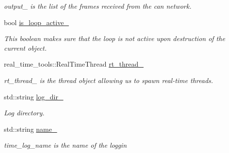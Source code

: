 \begin{DoxyCompactItemize}
\begin{DoxyCompactList}\small\item\em output\+\_\+ is the list of the frames received from the can network. \end{DoxyCompactList}\item 
bool \hyperlink{classblmc__drivers_1_1CanBus_a85c9d5d9c6413c6871d48a247660ac20}{is\+\_\+loop\+\_\+active\+\_\+}\hypertarget{classblmc__drivers_1_1CanBus_a85c9d5d9c6413c6871d48a247660ac20}{}\label{classblmc__drivers_1_1CanBus_a85c9d5d9c6413c6871d48a247660ac20}

\begin{DoxyCompactList}\small\item\em This boolean makes sure that the loop is not active upon destruction of the current object. \end{DoxyCompactList}\item 
real\+\_\+time\+\_\+tools\+::\+Real\+Time\+Thread \hyperlink{classblmc__drivers_1_1CanBus_a906baf827eff3c2850728478764a4759}{rt\+\_\+thread\+\_\+}\hypertarget{classblmc__drivers_1_1CanBus_a906baf827eff3c2850728478764a4759}{}\label{classblmc__drivers_1_1CanBus_a906baf827eff3c2850728478764a4759}

\begin{DoxyCompactList}\small\item\em rt\+\_\+thread\+\_\+ is the thread object allowing us to spawn real-\/time threads. \end{DoxyCompactList}\item 
std\+::string \hyperlink{classblmc__drivers_1_1CanBus_aef341b0b36d3f02087047b5234ccbf79}{log\+\_\+dir\+\_\+}\hypertarget{classblmc__drivers_1_1CanBus_aef341b0b36d3f02087047b5234ccbf79}{}\label{classblmc__drivers_1_1CanBus_aef341b0b36d3f02087047b5234ccbf79}

\begin{DoxyCompactList}\small\item\em Log directory. \end{DoxyCompactList}\item 
std\+::string \hyperlink{classblmc__drivers_1_1CanBus_aa726bd0d63a783d2a3cc02e2ef9c929b}{name\+\_\+}\hypertarget{classblmc__drivers_1_1CanBus_aa726bd0d63a783d2a3cc02e2ef9c929b}{}\label{classblmc__drivers_1_1CanBus_aa726bd0d63a783d2a3cc02e2ef9c929b}

\begin{DoxyCompactList}\small\item\em time\+\_\+log\+\_\+name is the name of the loggin \end{DoxyCompactList}\end{DoxyCompactItemize}
